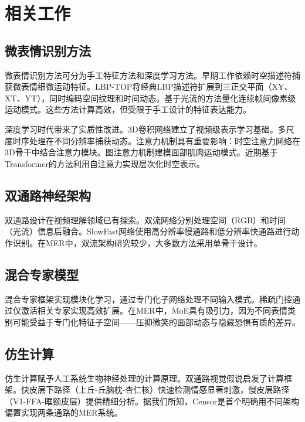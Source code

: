 
\section{相关工作}

\subsection{微表情识别方法}

微表情识别方法可分为手工特征方法和深度学习方法。早期工作依赖时空描述符捕获微表情细微运动特征。LBP-TOP\cite{zhao2007lbptop}将经典LBP描述符扩展到三正交平面（XY、XT、YT），同时编码空间纹理和时间动态。基于光流的方法\cite{wang2015offapexnet}量化连续帧间像素级运动模式。这些方法计算高效，但受限于手工设计的特征表达能力。

深度学习时代带来了实质性改进。3D卷积网络\cite{tran2015c3d}建立了视频级表示学习基础。多尺度时序处理\cite{ben2022survey}在不同分辨率捕获动态。注意力机制具有重要影响：时空注意力网络在3D骨干中结合注意力模块。图注意力机制\cite{ben2022survey}建模面部肌肉运动模式。近期基于Transformer的方法\cite{liu2022videoSwin}利用自注意力实现层次化时空表示。

\subsection{双通路神经架构}

双通路设计在视频理解领域已有探索。双流网络\cite{simonyan2014twostream}分别处理空间（RGB）和时间（光流）信息后融合。SlowFast网络\cite{feichtenhofer2019slowfast}使用高分辨率慢通路和低分辨率快通路进行动作识别。在MER中，双流架构研究较少，大多数方法采用单骨干设计。

\subsection{混合专家模型}

混合专家框架\cite{jacobs1991moe}实现模块化学习，通过专门化子网络处理不同输入模式。稀疏门控\cite{fedus2022switch}通过仅激活相关专家实现高效扩展。在MER中，MoE具有吸引力，因为不同表情类别可能受益于专门化特征子空间——压抑微笑的面部动态与隐藏恐惧有质的差异。

\subsection{仿生计算}

仿生计算赋予人工系统生物神经处理的计算原理。双通路视觉假说启发了计算框架\cite{morris1999amygdala}。快皮层下路径（上丘-丘脑枕-杏仁核）快速检测情感显著刺激，慢皮层路径（V1-FFA-眶额皮层）提供精细分析。据我们所知，Censor是首个明确用不同架构偏置实现两条通路的MER系统。